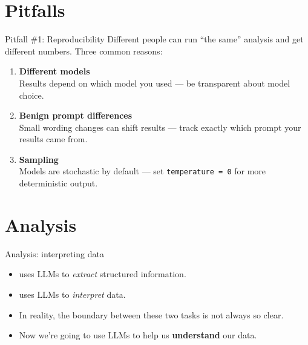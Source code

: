 \documentclass[aspectratio=169,t]{beamer}
\begin{document}
\section{Pitfalls}
\roadmapframe

\begin{frame}{Pitfall \#1: Reproducibility}
    Different people can run ``the same'' analysis and get different numbers.
    Three common reasons:
    \begin{enumerate}
        \item \textbf{Different models} \\
              {\small Results depend on which model you used --- be transparent
              about model choice.}
        \item \textbf{Benign prompt differences} \\
              {\small Small wording changes can shift results --- track exactly
              which prompt your results came from.}
        \item \textbf{Sampling} \\
              {\small Models are stochastic by default --- set
              \texttt{temperature = 0} for more deterministic output.}
    \end{enumerate}
\end{frame}

\section{Analysis}
\roadmapframe

\begin{frame}{Analysis: interpreting data}
    \begin{itemize}
        \item {} uses LLMs to \emph{extract}
              structured information.
        \item {} uses LLMs to \emph{interpret} data.
        \item In reality, the boundary between these two tasks is not always so
              clear.
        \item Now we're going to use LLMs to help us \textbf{understand} our
              data.
    \end{itemize}
\end{frame}
\end{document}

